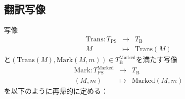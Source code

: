 \documentclass[dvipdfmx,uplatex]{jsarticle}
\theoremstyle{customnonumberbreakfortheorem}
\theoremstyle{customnonumberbreakforproof}
\begin{document}
\subsection{翻訳写像}

写像
\begin{eqnarray*}
\textrm{Trans} \colon T_{\textrm{PS}} & \to & T_{\textrm{B}} \\
M & \mapsto & \textrm{Trans}(M)
\end{eqnarray*}
と\((\textrm{Trans}(M),\textrm{Mark}(M,m)) \in T_{\textrm{B}}^{\textrm{Marked}}\)を満たす写像
\begin{eqnarray*}
\textrm{Mark} \colon T_{\textrm{PS}}^{\textrm{Marked}} & \to & T_{\textrm{B}} \\
(M,m) & \mapsto & \textrm{Marked}(M,m)
\end{eqnarray*}
を以下のように再帰的に定める：
\end{document}
